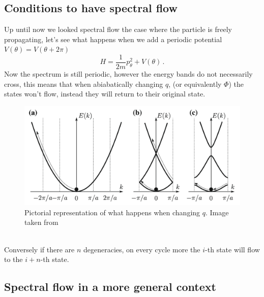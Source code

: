    \subsection*{Conditions to have spectral flow}
        Up until now we looked spectral flow the case where the particle is freely propagating, let's see what happens when we add a periodic potential $V(\theta)=V(\theta+2\pi)$
        \[
            H=\frac 1{2m}p_\theta^2 + V(\theta)\,.
        \]
        Now the spectrum is still periodic, however the energy bands do not necessarily cross, this means that  when abiabatically changing $q$, (or equivalently $\Phi$) the states won't flow, instead they will return to their original state.
        \begin{figure}[h]
            \includegraphics[width=\linewidth]{Immagini/topo/grosso-flow.png}
            \caption{Pictorial representation of what happens when changing $q$. Image taken from \cite{grosso2013solid}}
        \end{figure}\\
        Conversely if there are $n$ degeneracies, on every cycle more the $i$-th state will flow to the $i+n$-th state.\newpage


    
    \subsection*{Spectral flow in a more general context}
    
